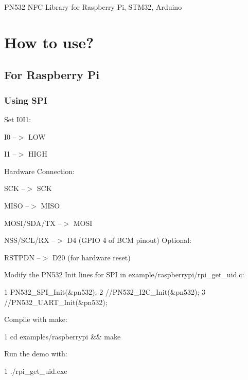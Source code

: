 P\+N532 N\+F\+C Library for Raspberry Pi, S\+T\+M32, Arduino



\section*{How to use?}

\subsection*{For Raspberry Pi}

\subsubsection*{Using S\+P\+I}


\begin{DoxyEnumerate}
\item Set I0\+I1\+:
\end{DoxyEnumerate}
\begin{DoxyItemize}
\item I0 --$>$ L\+O\+W
\item I1 --$>$ H\+I\+G\+H
\end{DoxyItemize}
\begin{DoxyEnumerate}
\item Hardware Connection\+:
\end{DoxyEnumerate}
\begin{DoxyItemize}
\item S\+C\+K --$>$ S\+C\+K
\item M\+I\+S\+O --$>$ M\+I\+S\+O
\item M\+O\+S\+I/\+S\+D\+A/\+T\+X --$>$ M\+O\+S\+I
\item N\+S\+S/\+S\+C\+L/\+R\+X --$>$ D4 (G\+P\+I\+O 4 of B\+C\+M pinout) Optional\+:
\item R\+S\+T\+P\+D\+N --$>$ D20 (for hardware reset)
\end{DoxyItemize}
\begin{DoxyEnumerate}
\item Modify the P\+N532 Init lines for S\+P\+I in {\ttfamily example/raspberrypi/rpi\+\_\+get\+\_\+uid.\+c}\+: 
\begin{DoxyCode}
1 PN532\_SPI\_Init(&pn532);
2 //PN532\_I2C\_Init(&pn532);
3 //PN532\_UART\_Init(&pn532);
\end{DoxyCode}

\item Compile with make\+: 
\begin{DoxyCode}
1 cd examples/raspberrypi && make
\end{DoxyCode}

\item Run the demo with\+: 
\begin{DoxyCode}
1 ./rpi\_get\_uid.exe
\end{DoxyCode}

\end{DoxyEnumerate}

